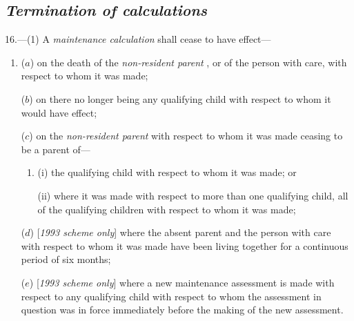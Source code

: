 \documentclass[12pt,a4paper]{article}
\begin{document}

\subsection*{\itshape Termination of 
\emph{calculations}  %
}

16.---(1) A 
\emph{maintenance calculation}  %
shall cease to have effect—
\begin{enumerate}\item[]
($a$) on the death of the 
\emph{non-resident parent}%
, or of the person with care, with respect to whom it was made;

($b$) on there no longer being any qualifying child with respect to whom it would have effect;

($c$) on the 
\emph{non-resident parent}  %
with respect to whom it was made ceasing to be a parent of—
\begin{enumerate}\item[]
(i) the qualifying child with respect to whom it was made; or

(ii) where it was made with respect to more than one qualifying child, all of the qualifying children with respect to whom it was made;
\end{enumerate}

($d$) [\emph{1993 scheme only}] where the absent parent and the person with care with respect to whom it was made have been living together for a continuous period of six months;

($e$) [\emph{1993 scheme only}] where a new maintenance assessment is made with respect to any qualifying child with respect to whom the assessment in question was in force immediately before the making of the new assessment.
\end{enumerate}
\end{document}
